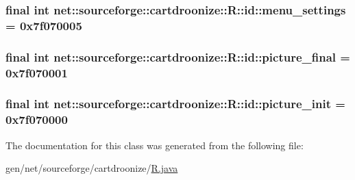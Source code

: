 \label{classnet_1_1sourceforge_1_1cartdroonize_1_1R_1_1id_a4e70b30fe48b503ff1840462da704f1a}
\hypertarget{classnet_1_1sourceforge_1_1cartdroonize_1_1R_1_1id_a0c5641c5ee704175eb1bbe4153e23398}{
\subsubsection[{menu\_\-settings}]{\setlength{\rightskip}{0pt plus 5cm}final int {\bf net::sourceforge::cartdroonize::R::id::menu\_\-settings} = 0x7f070005}}
\label{classnet_1_1sourceforge_1_1cartdroonize_1_1R_1_1id_a0c5641c5ee704175eb1bbe4153e23398}
\hypertarget{classnet_1_1sourceforge_1_1cartdroonize_1_1R_1_1id_a6406aea3f1bd1952d4f9e7fcf0b33450}{
\subsubsection[{picture\_\-final}]{\setlength{\rightskip}{0pt plus 5cm}final int {\bf net::sourceforge::cartdroonize::R::id::picture\_\-final} = 0x7f070001}}
\label{classnet_1_1sourceforge_1_1cartdroonize_1_1R_1_1id_a6406aea3f1bd1952d4f9e7fcf0b33450}
\hypertarget{classnet_1_1sourceforge_1_1cartdroonize_1_1R_1_1id_a5553ee92e4afb2ada8419ec105ccec7e}{
\subsubsection[{picture\_\-init}]{\setlength{\rightskip}{0pt plus 5cm}final int {\bf net::sourceforge::cartdroonize::R::id::picture\_\-init} = 0x7f070000}}
\label{classnet_1_1sourceforge_1_1cartdroonize_1_1R_1_1id_a5553ee92e4afb2ada8419ec105ccec7e}


The documentation for this class was generated from the following file:\begin{DoxyCompactItemize}
\item 
gen/net/sourceforge/cartdroonize/\hyperlink{R_8java}{R.java}\end{DoxyCompactItemize}
